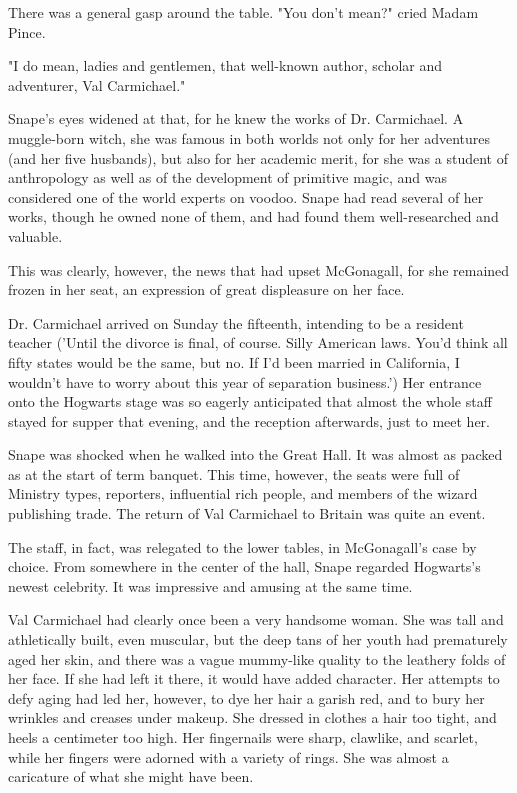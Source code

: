 There was a general gasp around the table. "You don't mean{\el}?" cried Madam Pince.

"I do mean, ladies and gentlemen, that well-known author, scholar and adventurer, Val Carmichael."

Snape's eyes widened at that, for he knew the works of Dr. Carmichael. A muggle-born witch, she was famous in both worlds not only for her adventures (and her five husbands), but also for her academic merit, for she was a student of anthropology as well as of the development of primitive magic, and was considered one of the world experts on voodoo. Snape had read several of her works, though he owned none of them, and had found them well-researched and valuable.

This was clearly, however, the news that had upset McGonagall, for she remained frozen in her seat, an expression of great displeasure on her face.

Dr. Carmichael arrived on Sunday the fifteenth, intending to be a resident teacher ('Until the divorce is final, of course. Silly American laws. You'd think all fifty states would be the same, but no. If I'd been married in California, I wouldn't have to worry about this year of separation business.') Her entrance onto the Hogwarts stage was so eagerly anticipated that almost the whole staff stayed for supper that evening, and the reception afterwards, just to meet her.

Snape was shocked when he walked into the Great Hall. It was almost as packed as at the start of term banquet. This time, however, the seats were full of Ministry types, reporters, influential rich people, and members of the wizard publishing trade. The return of Val Carmichael to Britain was quite an event.

The staff, in fact, was relegated to the lower tables, in McGonagall's case by choice. From somewhere in the center of the hall, Snape regarded Hogwarts's newest celebrity. It was impressive and amusing at the same time.

Val Carmichael had clearly once been a very handsome woman. She was tall and athletically built, even muscular, but the deep tans of her youth had prematurely aged her skin, and there was a vague mummy-like quality to the leathery folds of her face. If she had left it there, it would have added character. Her attempts to defy aging had led her, however, to dye her hair a garish red, and to bury her wrinkles and creases under makeup. She dressed in clothes a hair too tight, and heels a centimeter too high. Her fingernails were sharp, clawlike, and scarlet, while her fingers were adorned with a variety of rings. She was almost a caricature of what she might have been.

